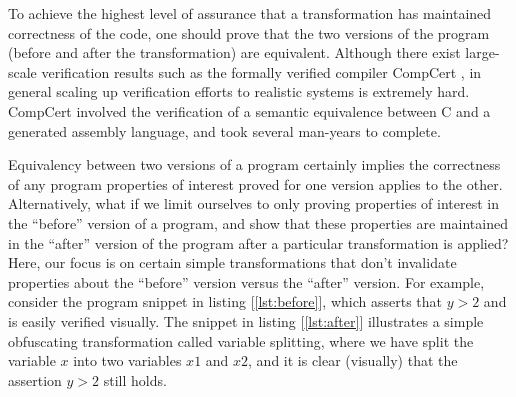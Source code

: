 \documentclass[compsoc,conference,a4paper,10pt,times]{IEEEtran}
\begin{document}
To achieve the highest level of assurance that a transformation has maintained correctness of the code, one should prove that the two versions of the program (before and after the transformation) are equivalent. Although there exist large-scale verification results such as the formally verified compiler CompCert \cite{CompCert}, in general scaling up verification efforts to realistic systems is extremely hard. CompCert involved the verification of a semantic equivalence between C and a generated assembly language, and took several man-years to complete. 

%
Equivalency between two versions of a program certainly implies the correctness of any program properties of interest proved for one version applies to the other.  Alternatively, what if we limit ourselves to only proving properties of interest in the ``before'' version of a program, and show that these properties are maintained in the ``after'' version of the program after a particular transformation is applied? 
%
Here, our focus is on certain simple transformations that don't invalidate properties about the ``before'' version versus the ``after'' version.  For example, consider the program snippet in listing [\ref{lst:before}], which asserts that $y > 2$ and is easily verified visually. The snippet in listing [\ref{lst:after}] illustrates a simple obfuscating transformation called variable splitting, where we have split the variable $x$ into two  variables $x1$ and $x2$, and it is clear (visually) that the assertion $y > 2$ still holds.
\end{document}
